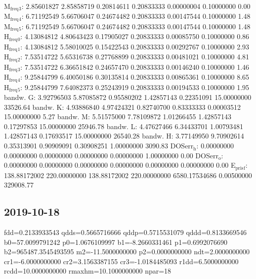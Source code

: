 \documentclass[11pt]{article}
\begin{document}
M\(_{\text{freq}}\)\(_{\text{3}}\):   2.85601827   2.85858719   0.20814611   0.20833333   0.00000004   0.10000000         0.00
M\(_{\text{freq}}\)\(_{\text{4}}\):   6.71192549   5.66706047   0.24674482   0.20833333   0.00147544   0.10000000         1.48
M\(_{\text{freq}}\)\(_{\text{5}}\):   6.71192549   5.66706047   0.24674482   0.20833333   0.00147544   0.10000000         1.48
H\(_{\text{freq}}\)\(_{\text{0}}\):   4.13084812   4.80643423   0.17905027   0.20833333   0.00085750   0.10000000         0.86
H\(_{\text{freq}}\)\(_{\text{1}}\):   4.13084812   5.58010025   0.15422543   0.20833333   0.00292767   0.10000000         2.93
H\(_{\text{freq}}\)\(_{\text{2}}\):   7.53514722   5.65316738   0.27768899   0.20833333   0.00481021   0.10000000         4.81
H\(_{\text{freq}}\)\(_{\text{3}}\):   7.53514722   6.36651842   0.24657470   0.20833333   0.00146240   0.10000000         1.46
H\(_{\text{freq}}\)\(_{\text{4}}\):   9.25844799   6.40050186   0.30135814   0.20833333   0.00865361   0.10000000         8.65
H\(_{\text{freq}}\)\(_{\text{5}}\):   9.25844799   7.64082373   0.25243919   0.20833333   0.00194533   0.10000000         1.95
bandw. G:   3.92796503   5.87085872   0.95580202   1.42857143   0.22351091  15.00000000     33526.64
bandw. K:   4.93886840   4.97424321   0.82740700   0.83333333   0.00003512  15.00000000         5.27
bandw. M:   5.51575000   7.78109872   1.01266455   1.42857143   0.17297853  15.00000000     25946.78
bandw. L:   4.47627466   6.34433701   1.00793481   1.42857143   0.17693517  15.00000000     26540.28
bandw. H:   3.77149950   9.70902614   0.35313901   0.90909091   0.30908251   1.00000000      3090.83
DOSerr\(_{\text{h}}\):   0.00000000   0.00000000   0.00000000   0.00000000   0.00000000   1.00000000         0.00
DOSerr\(_{\text{o}}\):   0.00000000   0.00000000   0.00000000   0.00000000   0.00000000   0.00000000         0.00
E\(_{\text{pris}}\)\(_{\text{f}}\): 138.88172002 220.00000000 138.88172002 220.00000000 6580.17534686   0.00500000    329008.77

\subsection{2019-10-18}
\label{sec:org83f05b1}

fdd=0.2133933543 qdds=0.5665716666 qddp=0.5715531079 qddd=0.8133669546 b0=57.0099791242 p0=1.0676109997 b1=-8.2660331461 p1=0.6992076690 b2=965487.3545493595 m2=-11.5000000000 p2=0.0000000000 ndt=2.0000000000 cr1=-6.0000000000 cr2=3.1563387155 cr3=-1.0184485093 r1dd=6.5000000000 rcdd=10.0000000000 rmaxhm=10.1000000000 npar=18 
\end{document}
